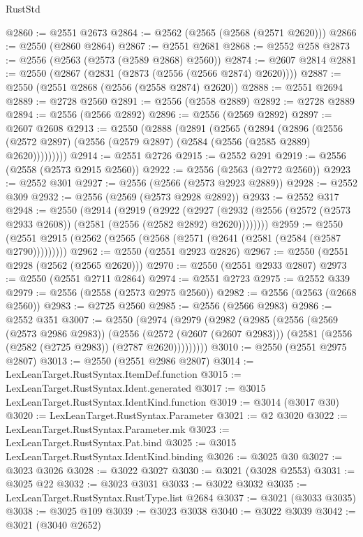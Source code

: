 \begin{lexlean}{RustStd}
\begin{coremodule}
{\begin{coremodule}
{{{{{{{{{{{{{{{{{{{{{{{{{{{{{{{{@2860 := @2551 @2673
@2864 := @2562 (@2565 (@2568 (@2571 @2620)))
@2866 := @2550 (@2860 @2864)
@2867 := @2551 @2681
@2868 := @2552 @258
@2873 := @2556 (@2563 (@2573 (@2589 @2868) @2560))
@2874 := @2607 @2814
@2881 := @2550 (@2867 (@2831 (@2873 (@2556 (@2566 @2874) @2620))))
@2887 := @2550 (@2551 @2868 (@2556 (@2558 @2874) @2620))
@2888 := @2551 @2694
@2889 := @2728 @2560
@2891 := @2556 (@2558 @2889)
@2892 := @2728 @2889
@2894 := @2556 (@2566 @2892)
@2896 := @2556 (@2569 @2892)
@2897 := @2607 @2608
@2913 := @2550
    (@2888
      (@2891
        (@2565
          (@2894
            (@2896
              (@2556 (@2572 @2897) (@2556 (@2579 @2897) (@2584 (@2556 (@2585 @2889) @2620)))))))))
@2914 := @2551 @2726
@2915 := @2552 @291
@2919 := @2556 (@2558 (@2573 @2915 @2560))
@2922 := @2556 (@2563 (@2772 @2560))
@2923 := @2552 @301
@2927 := @2556 (@2566 (@2573 @2923 @2889))
@2928 := @2552 @309
@2932 := @2556 (@2569 (@2573 @2928 @2892))
@2933 := @2552 @317
@2948 := @2550
    (@2914
      (@2919
        (@2922
          (@2927 (@2932 (@2556 (@2572 (@2573 @2933 @2608)) (@2581 (@2556 (@2582 @2892) @2620))))))))
@2959 := @2550 (@2551 @2915 (@2562 (@2565 (@2568 (@2571 (@2641 (@2581 (@2584 (@2587 @2790)))))))))
@2962 := @2550 (@2551 @2923 @2826)
@2967 := @2550 (@2551 @2928 (@2562 (@2565 @2620)))
@2970 := @2550 (@2551 @2933 @2807)
@2973 := @2550 (@2551 @2711 @2864)
@2974 := @2551 @2723
@2975 := @2552 @339
@2979 := @2556 (@2558 (@2573 @2975 @2560))
@2982 := @2556 (@2563 (@2668 @2560))
@2983 := @2725 @2560
@2985 := @2556 (@2566 @2983)
@2986 := @2552 @351
@3007 := @2550
    (@2974
      (@2979
        (@2982
          (@2985
            (@2556
              (@2569 (@2573 @2986 @2983))
              (@2556
                (@2572 (@2607 (@2607 @2983)))
                (@2581 (@2556 (@2582 (@2725 @2983)) (@2787 @2620)))))))))
@3010 := @2550 (@2551 @2975 @2807)
@3013 := @2550 (@2551 @2986 @2807)
@3014 := LexLeanTarget.RustSyntax.ItemDef.function
@3015 := LexLeanTarget.RustSyntax.Ident.generated
@3017 := @3015 LexLeanTarget.RustSyntax.IdentKind.function
@3019 := @3014 (@3017 @30)
@3020 := LexLeanTarget.RustSyntax.Parameter
@3021 := @2 @3020
@3022 := LexLeanTarget.RustSyntax.Parameter.mk
@3023 := LexLeanTarget.RustSyntax.Pat.bind
@3025 := @3015 LexLeanTarget.RustSyntax.IdentKind.binding
@3026 := @3025 @30
@3027 := @3023 @3026
@3028 := @3022 @3027
@3030 := @3021 (@3028 @2553)
@3031 := @3025 @22
@3032 := @3023 @3031
@3033 := @3022 @3032
@3035 := LexLeanTarget.RustSyntax.RustType.list @2684
@3037 := @3021 (@3033 @3035)
@3038 := @3025 @109
@3039 := @3023 @3038
@3040 := @3022 @3039
@3042 := @3021 (@3040 @2652)
}}}}}}}}}}}}}}}}}}}}}}}}}}}}}}}}
\end{coremodule}}
\end{coremodule}
\end{lexlean}
